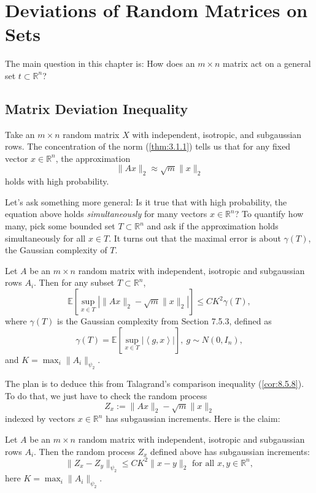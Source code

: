 \section{Deviations of Random Matrices on Sets}
The main question in this chapter is: How does an $m \times n$ matrix act on a general set $t \subset 
\mathbb{R}^n$? 



\subsection{Matrix Deviation Inequality}
Take an $m \times n$ random matrix $X$ with independent, isotropic, and subgaussian rows. The concentration of 
the norm (\cref{thm:3.1.1}) tells us that for any fixed vector $x \in \mathbb{R}^n$, the approximation 
\[ \lVert Ax \rVert_{2} \approx \sqrt{m}\lVert x \rVert_{2} \]
holds with high probability.

Let's ask something more general: Is it true that with high probability, the equation above holds 
\textit{simultaneously} for many vectors $x \in \mathbb{R}^n$? To quantify how many, pick some bounded set 
$T \subset \mathbb{R}^n$ and ask if the approximation holds simultaneously for all $x \in T$. It turns out that 
the maximal error is about $\gamma(T)$, the Gaussian complexity of $T$.

\begin{theorem}
\label{thm:9.1.1}
Let $A$ be an $m \times n$ random matrix with independent, isotropic and subgaussian rows $A_i$. Then for any 
subset $T \subset \mathbb{R}^n$, 
\[ \mathbb{E}\left[ \sup_{x \in T}\left| \lVert Ax \rVert_{2} - \sqrt{m}\lVert x \rVert_{2} \right| \right] 
\leq CK^2 \gamma(T), \]
where $\gamma(T)$ is the Gaussian complexity from Section 7.5.3, defined as 
\[ \gamma(T) = \mathbb{E}\left[ \sup_{x \in T}|\left\langle g, x \right\rangle| \right], \ g \sim N(0, I_n), \]
and $K = \max_{i} \lVert A_i \rVert_{\psi_2}$.
\end{theorem}

The plan is to deduce this from Talagrand's comparison inequality (\cref{cor:8.5.8}). To do that, we just have 
to check the random process 
\[ Z_x := \lVert Ax \rVert_{2} - \sqrt{m}\lVert x \rVert_{2} \]
indexed by vectors $x \in \mathbb{R}^n$ has subgaussian increments. Here is the claim:

\begin{theorem}
\label{thm:9.1.2}
Let $A$ be an $m \times n$ random matrix with independent, isotropic and subgaussian rows $A_i$. Then the random 
process $Z_x$ defined above has subgaussian increments: 
\[ \lVert Z_x - Z_y \rVert_{\psi_2} \leq CK^2 \lVert x - y \rVert_{2} \text{ for all } x, y \in \mathbb{R}^n, \]
here $K = \max_{i} \lVert A_i \rVert_{\psi_2}$.
\end{theorem}

